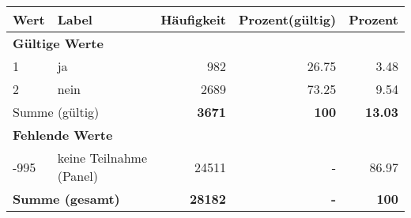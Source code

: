      \begin{longtable}{lXrrr}
     \toprule
     \textbf{Wert} & \textbf{Label} & \textbf{Häufigkeit} & \textbf{Prozent(gültig)} & \textbf{Prozent} \\
     \endhead
     \midrule
     \multicolumn{5}{l}{\textbf{Gültige Werte}}\\

     1 &
     \multicolumn{1}{X}{ ja   } &


       \num{982} &
       \num[round-mode=places,round-precision=2]{26.75} &
         \num[round-mode=places,round-precision=2]{3.48} \\

     2 &
     \multicolumn{1}{X}{ nein   } &


       \num{2689} &
       \num[round-mode=places,round-precision=2]{73.25} &
         \num[round-mode=places,round-precision=2]{9.54} \\
     \midrule
     \multicolumn{2}{l}{Summe (gültig)} &
       \textbf{\num{3671}} &
     \textbf{\num{100}} &
       \textbf{\num[round-mode=places,round-precision=2]{13.03}} \\
     \multicolumn{5}{l}{\textbf{Fehlende Werte}}\\
       -995 &
       keine Teilnahme (Panel) &
         \num{24511} &
        - &
         \num[round-mode=places,round-precision=2]{86.97} \\
     \midrule
     \multicolumn{2}{l}{\textbf{Summe (gesamt)}} &
          \textbf{\num{28182}} &
        \textbf{-} &
        \textbf{\num{100}} \\
     \bottomrule
     \end{longtable}
     
